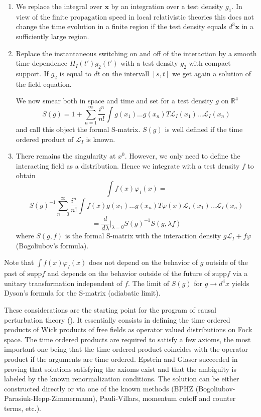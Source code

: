 \documentclass[12pt]{article}
\newcommand{\Lcal}{\mathcal {L}}
\newcommand{\RR}{\mathbb{R}}           %
\newcommand{\ph}{\varphi}
\newcommand{\1}{\mathds{1}}                         %
\begin{document}
{{{{{\begin{enumerate}
\item We replace the integral over $\mathbf x$ by an integration over a test density $g_1$. In view of the finite propagation speed in local relativistic theories this does not change the time evolution in a finite region if the test density equals $d^3\mathbf x$ in a sufficiently large region. 
\item Replace the instantaneous switching on and off of the interaction by a smooth time dependence $H_I(t')g_2(t')$ with a test density $g_2$ with compact support. If $g_2$ is equal to $dt$ on the intervall $[s,t]$ we get again a solution of the field equation.

We now smear both in space and time and set for a test density $g$ on $\RR^4$
\[S(g)=1+\sum_{n=1}^\infty\frac{i^n}{n!}\int g(x_1)\dots  g(x_n)T\Lcal_I(x_1)\dots \Lcal_I(x_n)\]
and call this object the formal S-matrix. $S(g)$ is well defined if the time ordered product of $\Lcal_I$ is known.
\item There remains the singularity at $x^0$. However, we only need to define the interacting field as a distribution. Hence we integrate with  a test density $f$ to obtain
\[\int f(x)\ph_I(x)=\]
\[S(g)^{-1}\sum_{n=0}^\infty \frac{i^n}{n!}\int f(x)g(x_1)\dots g(x_n)T\ph(x)\Lcal_I(x_1)\dots \Lcal_I(x_n)\]
\[=\frac{d}{d\lambda}|_{\lambda=0}S(g)^{-1}S(g,\lambda f)\] 
where $S(g,f)$ is the formal S-matrix with the interaction density $g\Lcal_I+f\ph$ (Bogoliubov's formula). 
\end{enumerate}

Note that $\int f(x)\ph_I(x)$ does not depend on the behavior of $g$ outside of the past of $\mathrm{supp}f$ and depends on the behavior outside of the future of $\mathrm{supp}f$ via a unitary transformation independent of $f$. The limit of $S(g)$ for $g\to d^4x$ yields Dyson's formula for the S-matrix (adiabatic limit).


These considerations are the starting point for the program of causal perturbation theory (\cite{SR,BS,BP,EG}).
{It essentially consists in defining the time ordered products of Wick products of free fields as operator valued distributions on Fock space.}
{The time ordered products are required to satisfy a few axioms, the most important one being that the time ordered product coincides with the operator product if the arguments are time ordered.}
{Epstein and Glaser \cite{EG} succeeded in proving that solutions satisfying the axioms exist and that the ambiguity is labeled by the known renormalization conditions. The solution can be either constructed directly or via one of the known methods (BPHZ  (Bogoliubov-Parasiuk-Hepp-Zimmermann), Pauli-Villars, momentum cutoff and counter terms, etc.).}

}}}}}
\end{document}
